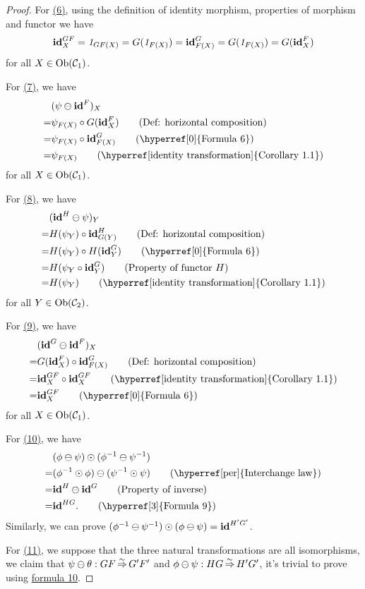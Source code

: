 \documentclass{article}
\begin{document}
\begin{proof}
	For \hyperref[0]{(6)}, using the definition of identity morphism, properties of morphism and functor we have
		$$\mathbf{id}^{GF}_X=\mathit{1}_{GF(X)}=G(\mathit{1}_{F(X)})=\mathbf{id}^G_{F(X)}=G(\mathit{1}_{F(X)})=G(\mathbf{id}^F_X)$$
	for all $X\in\mathrm{Ob}(\mathcal{C}_1)$.
	
	For \hyperref[1]{(7)}, we have
	\begin{align*}
		 & (\psi\ominus\tid^F)_X\\
		=& \psi_{F(X)}\circ G(\tid^F_X)\tag{Def: horizontal composition}\\
		=& \psi_{F(X)}\circ \tid^G_{F(X)}\tag{\hyperref[0]{Formula 6}}\\
		=& \psi_{F(X)}\tag{\hyperref[identity transformation]{Corollary 1.1}}
	\end{align*}
	for all $X\in\mathrm{Ob}(\mathcal{C}_1)$.
	
	For \hyperref[2]{(8)}, we have
	\begin{align*}
		 & (\tid^H\ominus\psi)_Y\\
		=& H(\psi_Y)\circ\tid^H_{G(Y)}\tag{Def: horizontal composition}\\
		=& H(\psi_Y)\circ H(\tid^G_Y)\tag{\hyperref[0]{Formula 6}}\\
		=& H(\psi_Y\circ\tid^G_Y)\tag{Property of functor $H$}\\
		=& H(\psi_Y)\tag{\hyperref[identity transformation]{Corollary 1.1}}
	\end{align*}
	for all $Y\in\mathrm{Ob}(\mathcal{C}_2)$.
	
	For \hyperref[3]{(9)}, we have 
	\begin{align*}
		 & (\tid^G\ominus\tid^F)_X\\
		=& G(\tid^F_X)\circ\tid^G_{F(X)}\tag{Def: horizontal composition}\\
		=& \tid^{GF}_X\circ\tid^{GF}_X\tag{\hyperref[identity transformation]{Corollary 1.1}}\\
		=& \tid^{GF}_X\tag{\hyperref[0]{Formula 6}}
	\end{align*}
	for all $X\in\mathrm{Ob}(\mathcal{C}_1)$.
	
	For \hyperref[4]{(10)}, we have
	\begin{align*}
		 & (\phi\ominus\psi)\odot(\phi\iv\ominus\psi\iv)\\
		=& (\phi\iv\odot\phi)\ominus(\psi\iv\odot\psi)\tag{\hyperref[per]{Interchange law}}\\
		=& \tid^H\ominus\tid^G\tag{Property of inverse}\\
		=& \tid^{HG}.\tag{\hyperref[3]{Formula 9}}
	\end{align*}
	Similarly, we can prove $(\phi^{-1}\ominus\psi^{-1})\odot(\phi\ominus\psi)=\mathbf{id}^{H'G'}$.
	
	For \hyperref[5]{(11)}, we suppose that the three natural transformations are all isomorphisms, we claim that $\psi\ominus\theta:GF\mathop{\Rightarrow}\limits^{\sim} G'F'$ and $\phi\ominus\psi:HG\mathop{\Rightarrow}\limits^{\sim} H'G'$, it's trivial to prove using \hyperref[4]{formula 10}.
\end{proof}
\end{document}
